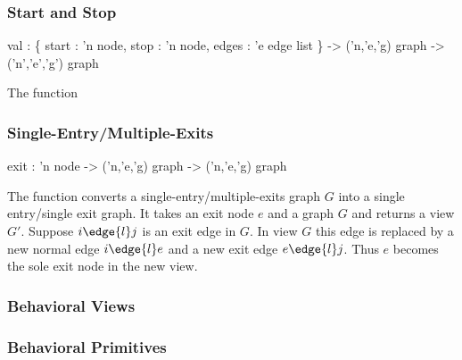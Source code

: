 \subsubsection{Start and Stop}
\begin{SML}
   val  :
     \{ start : 'n node,
        stop  : 'n node,
        edges : 'e edge list
     \} -> ('n,'e,'g) graph -> ('n','e','g') graph
\end{SML}

The function 

\subsubsection{Single-Entry/Multiple-Exits}
\begin{SML}
     exit : 'n node -> ('n,'e,'g) graph -> ('n,'e,'g) graph
\end{SML}

The function  converts a single-entry/multiple-exits 
graph $G$ into a single entry/single exit graph.
It takes an exit node $e$ and a graph $G$ and returns
a view $G'$.  Suppose $i \edge{l} j$ is an exit edge in $G$.
In view $G$ this edge is replaced by a new normal edge $i \edge{l} e$
and a new exit edge $e \edge{l} j$.  Thus $e$ becomes the sole exit
node in the new view.  

\subsubsection{Behavioral Views}

\subsubsection{Behavioral Primitives}

